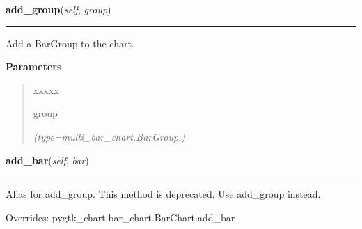     \label{pygtk_chart:multi_bar_chart:MultiBarChart:add_group}

    \vspace{0.5ex}

\hspace{.8\funcindent}\begin{boxedminipage}{\funcwidth}

    \raggedright \textbf{add\_group}(\textit{self}, \textit{group})

    \vspace{-1.5ex}

    \rule{\textwidth}{0.5\fboxrule}
\setlength{\parskip}{2ex}
    Add a BarGroup to the chart.

\setlength{\parskip}{1ex}
      \textbf{Parameters}
      \vspace{-1ex}

      \begin{quote}
        \begin{Ventry}{xxxxx}

          \item[group]

            {\it (type=multi\_bar\_chart.BarGroup.)}

        \end{Ventry}

      \end{quote}

    \end{boxedminipage}

    \vspace{0.5ex}

\hspace{.8\funcindent}\begin{boxedminipage}{\funcwidth}

    \raggedright \textbf{add\_bar}(\textit{self}, \textit{bar})

    \vspace{-1.5ex}

    \rule{\textwidth}{0.5\fboxrule}
\setlength{\parskip}{2ex}
    Alias for add\_group. This method is deprecated. Use add\_group 
    instead.

\setlength{\parskip}{1ex}
      Overrides: pygtk\_chart.bar\_chart.BarChart.add\_bar

    \end{boxedminipage}


